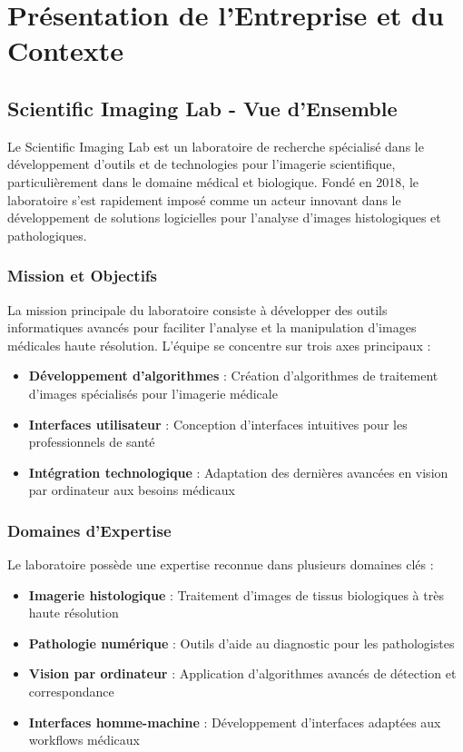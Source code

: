 \documentclass[12pt,a4paper]{article}
\begin{document}
\newpage

\section{Présentation de l'Entreprise et du Contexte}

\subsection{Scientific Imaging Lab - Vue d'Ensemble}

Le Scientific Imaging Lab est un laboratoire de recherche spécialisé dans le développement d'outils et de technologies pour l'imagerie scientifique, particulièrement dans le domaine médical et biologique. Fondé en 2018, le laboratoire s'est rapidement imposé comme un acteur innovant dans le développement de solutions logicielles pour l'analyse d'images histologiques et pathologiques.

\subsubsection{Mission et Objectifs}

La mission principale du laboratoire consiste à développer des outils informatiques avancés pour faciliter l'analyse et la manipulation d'images médicales haute résolution. L'équipe se concentre sur trois axes principaux :

\begin{itemize}
\item \textbf{Développement d'algorithmes} : Création d'algorithmes de traitement d'images spécialisés pour l'imagerie médicale
\item \textbf{Interfaces utilisateur} : Conception d'interfaces intuitives pour les professionnels de santé
\item \textbf{Intégration technologique} : Adaptation des dernières avancées en vision par ordinateur aux besoins médicaux
\end{itemize}

\subsubsection{Domaines d'Expertise}

Le laboratoire possède une expertise reconnue dans plusieurs domaines clés :

\begin{itemize}
\item \textbf{Imagerie histologique} : Traitement d'images de tissus biologiques à très haute résolution
\item \textbf{Pathologie numérique} : Outils d'aide au diagnostic pour les pathologistes
\item \textbf{Vision par ordinateur} : Application d'algorithmes avancés de détection et correspondance
\item \textbf{Interfaces homme-machine} : Développement d'interfaces adaptées aux workflows médicaux
\end{itemize}
\end{document}
